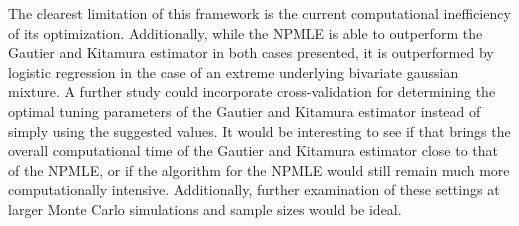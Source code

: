 \documentclass[11pt]{article}
\begin{document}
The clearest limitation of this framework is the current computational inefficiency of its optimization. Additionally, while the NPMLE is able to outperform the Gautier and Kitamura estimator in both cases presented, it is outperformed by logistic regression in the case of an extreme underlying bivariate gaussian mixture. A further study could incorporate cross-validation for determining the optimal tuning parameters of the Gautier and Kitamura estimator instead of simply using the suggested values. It would be interesting to see if that brings the overall computational time of the Gautier and Kitamura estimator close to that of the NPMLE, or if the algorithm for the NPMLE would still remain much more computationally intensive. Additionally, further examination of these settings at larger Monte Carlo simulations and sample sizes would be ideal. 

\begin{singlespace}
	
	
\end{singlespace}
\end{document}
